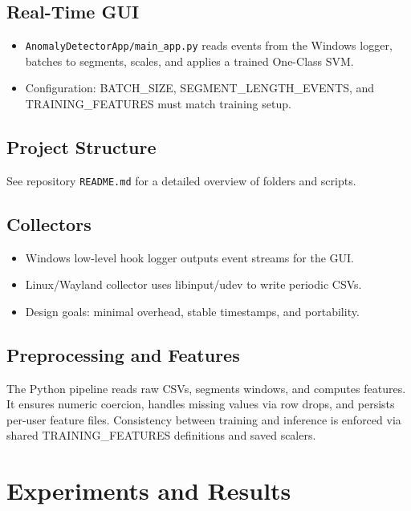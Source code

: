 \documentclass[
  12pt,
  a4paper,
]{report}
\providecommand{\tightlist}{%
  \setlength{\itemsep}{0pt}\setlength{\parskip}{0pt}}
\begin{document}
\section{Real-Time GUI}\label{real-time-gui}

\begin{itemize}
\tightlist
\item
  \texttt{AnomalyDetectorApp/main\_app.py} reads events from the Windows
  logger, batches to segments, scales, and applies a trained One-Class
  SVM.
\item
  Configuration: BATCH\_SIZE, SEGMENT\_LENGTH\_EVENTS, and
  TRAINING\_FEATURES must match training setup.
\end{itemize}

\section{Project Structure}\label{project-structure}

See repository \texttt{README.md} for a detailed overview of folders and
scripts.

\section{Collectors}\label{collectors}

\begin{itemize}
\tightlist
\item
  Windows low-level hook logger outputs event streams for the GUI.
\item
  Linux/Wayland collector uses libinput/udev to write periodic CSVs.
\item
  Design goals: minimal overhead, stable timestamps, and portability.
\end{itemize}

\section{Preprocessing and Features}\label{preprocessing-and-features}

The Python pipeline reads raw CSVs, segments windows, and computes
features. It ensures numeric coercion, handles missing values via row
drops, and persists per-user feature files. Consistency between training
and inference is enforced via shared TRAINING\_FEATURES definitions and
saved scalers.

\chapter{Experiments and Results}\label{experiments-and-results}
\end{document}
